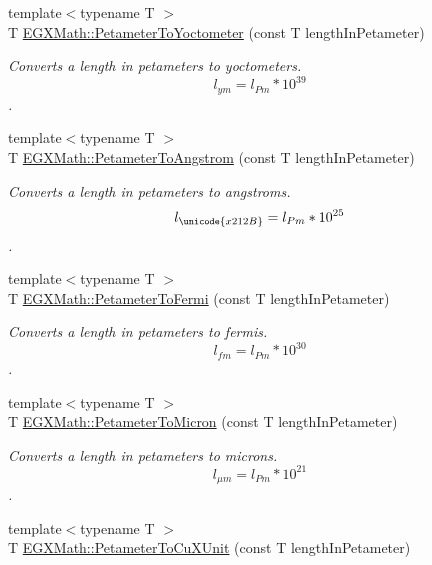 \begin{DoxyCompactItemize}
{\footnotesize template$<$typename T $>$ }\\T \mbox{\hyperlink{group___e_g_x_math-_conversions-_length_conversions-_s_i-_petameter-_s_i_ga6fd2701bf757e5a6ca26a0d506471433}{E\+G\+X\+Math\+::\+Petameter\+To\+Yoctometer}} (const T length\+In\+Petameter)
\begin{DoxyCompactList}\small\item\em Converts a length in petameters to yoctometers. \[ l_{ym}=l_{Pm} * 10^{39} \]. \end{DoxyCompactList}\item 
{\footnotesize template$<$typename T $>$ }\\T \mbox{\hyperlink{group___e_g_x_math-_conversions-_length_conversions-_s_i-_petameter-_non-_s_i_ga2acc301b8b78a80d23a150da8cba3814}{E\+G\+X\+Math\+::\+Petameter\+To\+Angstrom}} (const T length\+In\+Petameter)
\begin{DoxyCompactList}\small\item\em Converts a length in petameters to angstroms. \[ l_{\unicode{x212B}}=l_{Pm} * 10^{25} \]. \end{DoxyCompactList}\item 
{\footnotesize template$<$typename T $>$ }\\T \mbox{\hyperlink{group___e_g_x_math-_conversions-_length_conversions-_s_i-_petameter-_non-_s_i_gaba0fd76c76316722eb49006d032fa493}{E\+G\+X\+Math\+::\+Petameter\+To\+Fermi}} (const T length\+In\+Petameter)
\begin{DoxyCompactList}\small\item\em Converts a length in petameters to fermis. \[ l_{fm}=l_{Pm} * 10^{30} \]. \end{DoxyCompactList}\item 
{\footnotesize template$<$typename T $>$ }\\T \mbox{\hyperlink{group___e_g_x_math-_conversions-_length_conversions-_s_i-_petameter-_non-_s_i_gad1c1c26c232339c6304962d20cb29252}{E\+G\+X\+Math\+::\+Petameter\+To\+Micron}} (const T length\+In\+Petameter)
\begin{DoxyCompactList}\small\item\em Converts a length in petameters to microns. \[ l_{\mu m}=l_{Pm} * 10^{21} \]. \end{DoxyCompactList}\item 
{\footnotesize template$<$typename T $>$ }\\T \mbox{\hyperlink{group___e_g_x_math-_conversions-_length_conversions-_s_i-_petameter-_non-_s_i_gad9b37964189c5963e4c634122fd763fe}{E\+G\+X\+Math\+::\+Petameter\+To\+Cu\+X\+Unit}} (const T length\+In\+Petameter)

\end{DoxyCompactItemize}
